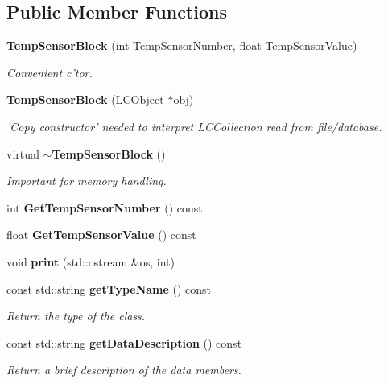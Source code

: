 \subsection*{Public Member Functions}
\begin{DoxyCompactItemize}
\item 
{\bf Temp\-Sensor\-Block} (int Temp\-Sensor\-Number, float Temp\-Sensor\-Value)\label{classCALICE_1_1TempSensorBlock_a5577684f2bdde7b3a3f201638f0aaf7a}

\begin{DoxyCompactList}\small\item\em Convenient c'tor. \end{DoxyCompactList}\item 
{\bf Temp\-Sensor\-Block} (L\-C\-Object $\ast$obj)\label{classCALICE_1_1TempSensorBlock_ae45af5d892fd90492c15584eb1694190}

\begin{DoxyCompactList}\small\item\em 'Copy constructor' needed to interpret L\-C\-Collection read from file/database. \end{DoxyCompactList}\item 
virtual {\bf $\sim$\-Temp\-Sensor\-Block} ()\label{classCALICE_1_1TempSensorBlock_aededba4f51f50d3056d76a31a97ec1ac}

\begin{DoxyCompactList}\small\item\em Important for memory handling. \end{DoxyCompactList}\item 
int {\bfseries Get\-Temp\-Sensor\-Number} () const \label{classCALICE_1_1TempSensorBlock_af99dd00f4a3450d25eaa8b2bcb1e2b38}

\item 
float {\bfseries Get\-Temp\-Sensor\-Value} () const \label{classCALICE_1_1TempSensorBlock_a1485ee33033ab3a99c2ee8d3e5273138}

\item 
void {\bfseries print} (std\-::ostream \&os, int)\label{classCALICE_1_1TempSensorBlock_af1650378e195b324cfddfa3c2feb9ce6}

\item 
const std\-::string {\bf get\-Type\-Name} () const \label{classCALICE_1_1TempSensorBlock_a00a31b0c70354ed04a4bddc7d62772f3}

\begin{DoxyCompactList}\small\item\em Return the type of the class. \end{DoxyCompactList}\item 
const std\-::string {\bf get\-Data\-Description} () const \label{classCALICE_1_1TempSensorBlock_ab9a8cfa10c171003da2614fb4518b566}

\begin{DoxyCompactList}\small\item\em Return a brief description of the data members. \end{DoxyCompactList}\end{DoxyCompactItemize}


